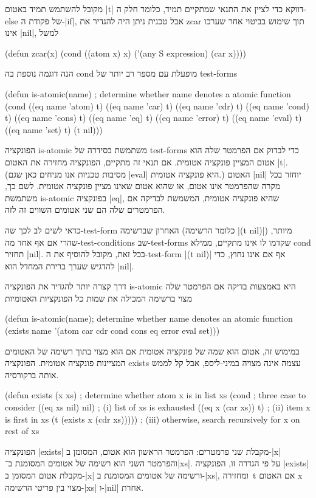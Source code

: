 מקובל להשתמש תמיד באטום \E|t| דווקא כדי לציין את התנאי שמתקיים תמיד, כלומר חלק
ה-else של פקודת ה-\E|if|, אבל טכנית ניתן היה להגדיר את zcar תוך שימוש בביטוי
אחר שערכו אינו \E|nil|, למשל
\begin{LISP}
(defun zcar(x)
  (cond ((atom x) x) ('(any S expression) (car x))))
\end{LISP}
הנה דוגמה נוספת בה cond מופעלת עם מספר רב יותר של test-forms
\begin{LISP}
(defun is-atomic(name) ; determine whether name denotes a atomic function
  (cond ((eq name 'atom) t)
        ((eq name 'car) t)
        ((eq name 'cdr) t)
        ((eq name 'cond) t)
        ((eq name 'cons) t)
        ((eq name 'eq) t)
        ((eq name 'error) t)
        ((eq name 'eval) t)
        ((eq name 'set) t)
        (t nil)))
\end{LISP}
הפונקציה is-atomic משתמשת בסידרה של test-forms כדי לבדוק אם הפרמטר שלה הוא
אטום המציין פונקציה אטומית. אם תנאי זה מתקיים, הפונקציה מחזירה את האטום
\E|t|. (מסיבות טכניות אנו מניחים כאן שגם \T|eval| היא פונקציה אטומית.)
האטום \E|nil| יוחזר בכל מקרה שהפרמטר אינו אטום, או שהוא אטום שאינו מציין
פונקציה אטומית. לשם כך, משתמשת
is-atomic בפונקציה \T|eq|, שהיא פונקציה אטומית, המשמשת לבדיקה אם הפרמטרים
שלה הם שני אטומים השווים זה לזה.

כדאי לשים לב לכך שה-test-form האחרון שברשימה (כלומר הרשימה \T|(t nil)|) מיותר,
שהרי אם אף אחד מה-test-conditions שב-test-forms שקדמו לו אינו מתקיים, ממילא
cond תחזיר \E|nil|. בכל זאת, מקובל להוסיף את ה-test-form \T|(t nil)| אף אם אינו
נחוץ, כדי להדגיש שערך ברירת המחדל הוא \E|nil|.

דרך קצרה יותר להגדיר את הפונקציה is-atomic היא באמצעות בדיקה אם הפרמטר
שלה מצוי ברשימה המכילה את שמות כל הפונקציות האטומיות
\begin{KERNEL}
(defun is-atomic(name); determine whether name denotes an atomic function
  (exists name '(atom car cdr cond cons eq error eval set)))
\end{KERNEL}
במימוש זה, אטום הוא שמה של פונקציה אטומית אם הוא מצוי בתוך רשימה של האטומים
המציינות פונקציה אטומית. הפונקציה exists עצמה אינה מצויה במיני-ליספ, אבל
קל לממש אותה ברקורסיה.
\begin{LISP}
(defun exists (x xs) ; determine whether atom x is in list xs
  (cond ; three case to consider
    ((eq xs nil) nil) ; (i) list of xs is exhausted
    ((eq x (car xs)) t) ; (ii) item x is first in xs
    (t (exists x (cdr xs))))) ; (iii) otherwise, search recursively for x on rest of xs
\end{LISP}
הפונקציה \T|exists| מקבלת שני פרמטרים: הפרמטר הראשון הוא אטום, המסומן ב-\T|x|
והפרמטר השני הוא רשימה של אטומים המסומנת ב־\T|xs|. על פי הגדרה זו, הפונקציה
\T|exists| מקבלת אטום המסומן ב-\T|x| ורשימה של אטומים המסומנת ב-\T|xs|,
ומחזירה~t אם האטום x מצוי בין פריטי הרשימה-\T|xs| ו-\T|nil| אחרת.

